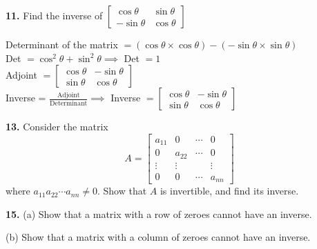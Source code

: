 \documentclass[addpoints]{exam}
\begin{document}
\begin{questions}
    \question
    \textbf{11. } Find the inverse of $ \begin{bmatrix}
        \cos\theta & \sin\theta \\ 
        -\sin\theta & \cos\theta
    \end{bmatrix} $
    \begin{solution}
        Determinant of the matrix $ = (\cos\theta \times \cos\theta) - (-\sin\theta \times \sin\theta)$ \\ 
        Det $ = \cos^2\theta + \sin^2\theta \implies $ Det $ = 1 $ \\ 
        Adjoint $ = \begin{bmatrix}
            \cos\theta & -\sin\theta \\ 
            \sin\theta & \cos\theta
        \end{bmatrix} $ \\  
        Inverse = $ \frac{\text{Adjoint}}{\text{Determinant}} \implies $ Inverse $ = \begin{bmatrix}
            \cos\theta & -\sin\theta \\ 
            \sin\theta & \cos\theta
        \end{bmatrix} $
    \end{solution}

    \question
    \textbf{13. } Consider the matrix $$ A = \begin{bmatrix}
        a_{11} & 0 & \cdots & 0 \\ 
        0 & a_{22} & \cdots & 0 \\
        \vdots & \vdots & & \vdots \\ 
        0 & 0 & \cdots & a_{nn}
    \end{bmatrix} $$
    where $ a_{11}a_{22}\cdots a_{nn} \neq 0 $. Show that $A$ is invertible, and find its inverse.
    \begin{solution}
        
    \end{solution}
    
    \question
    \textbf{15. } (a) Show that a matrix with a row of zeroes cannot have an inverse. 


    \hspace{7.5mm} (b) Show that a matrix with a column of zeroes cannot have an inverse.
    \begin{solution}
        
    \end{solution}


\end{questions}
\end{document}
